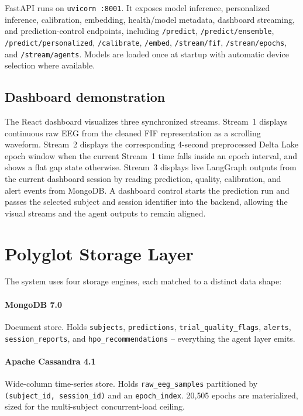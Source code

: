 \documentclass[conference]{IEEEtran}
\begin{document}
FastAPI runs on \texttt{uvicorn :8001}. It exposes model inference,
personalized inference, calibration, embedding, health/model metadata,
dashboard streaming, and prediction-control endpoints, including
\texttt{/predict}, \texttt{/predict/ensemble},
\texttt{/predict/personalized}, \texttt{/calibrate}, \texttt{/embed},
\texttt{/stream/fif}, \texttt{/stream/epochs}, and
\texttt{/stream/agents}. Models are loaded once at startup with automatic
device selection where available.

\subsection{Dashboard demonstration}

The React dashboard visualizes three synchronized streams. Stream~1 displays
continuous raw EEG from the cleaned FIF representation as a scrolling waveform.
Stream~2 displays the corresponding 4-second preprocessed Delta Lake epoch
window when the current Stream~1 time falls inside an epoch interval, and shows
a flat gap state otherwise. Stream~3 displays live LangGraph outputs from the
current dashboard session by reading prediction, quality, calibration, and
alert events from MongoDB. A dashboard control starts the prediction run and
passes the selected subject and session identifier into the backend, allowing
the visual streams and the agent outputs to remain aligned.

\section{Polyglot Storage Layer}

The system uses four storage engines, each matched to a distinct data shape:

\paragraph{MongoDB 7.0} Document store. Holds \texttt{subjects},
\texttt{predictions}, \texttt{trial\_quality\_flags}, \texttt{alerts},
\texttt{session\_reports}, and \texttt{hpo\_recommendations} -- everything
the agent layer emits.

\paragraph{Apache Cassandra 4.1} Wide-column time-series store. Holds
\texttt{raw\_eeg\_samples} partitioned by \texttt{(subject\_id, session\_id)}
and an \texttt{epoch\_index}. 20{,}505 epochs are materialized, sized for the
multi-subject concurrent-load ceiling.
\end{document}
